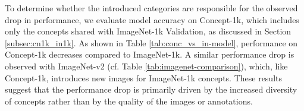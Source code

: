 \documentclass[11pt]{article}
\begin{document}
To determine whether the introduced categories are responsible for the observed drop in performance, we evaluate model accuracy on Concept-1k, which includes only the concepts shared with ImageNet-1k Validation, as discussed in Section \ref{subsec:cn1k_in1k}. As shown in Table \ref{tab:conc_vs_in-model}, performance on Concept-1k decreases compared to ImageNet-1k. A similar performance drop is observed with ImageNet-v2 (cf. Table \ref{tab:imagenet-comparison}), which, like Concept-1k, introduces new images for ImageNet-1k concepts.
These results suggest that the performance drop is primarily driven by the increased diversity of concepts rather than by the quality of the images or annotations.
\end{document}

